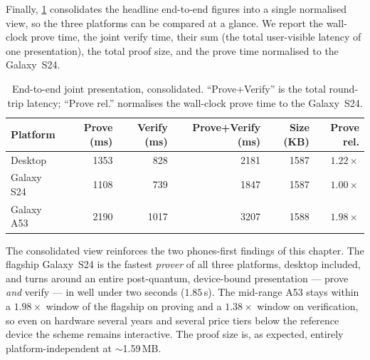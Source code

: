 \documentclass[binding=0.6cm,oneside,noexaminfo]{sapthesis}
\begin{document}
Finally, \cref{tab:res-crossplatform} consolidates the headline end-to-end
figures into a single normalised view, so the three platforms can be compared at a
glance. We report the wall-clock prove time, the joint verify time, their sum (the
total user-visible latency of one presentation), the total proof size, and the
prove time normalised to the Galaxy~S24.

\begin{table}[ht]
  \centering
  \caption{End-to-end joint presentation, consolidated. ``Prove+Verify'' is the
  total round-trip latency; ``Prove rel.'' normalises the wall-clock prove time to
  the Galaxy~S24.}
  \label{tab:res-crossplatform}
  \small
  \begin{tabular}{@{}lrrrrr@{}}
    \toprule
    \textbf{Platform} & \textbf{Prove (ms)} & \textbf{Verify (ms)} & \textbf{Prove+Verify (ms)} & \textbf{Size (KB)} & \textbf{Prove rel.} \\
    \midrule
    Desktop    & 1353 & 828  & 2181 & 1587 & $1.22\times$ \\
    Galaxy S24 & 1108 & 739  & 1847 & 1587 & $1.00\times$ \\
    Galaxy A53 & 2190 & 1017 & 3207 & 1588 & $1.98\times$ \\
    \bottomrule
  \end{tabular}
\end{table}

The consolidated view reinforces the two phones-first findings of this chapter.
The flagship Galaxy~S24 is the fastest \emph{prover} of all three platforms,
desktop included, and turns around an entire post-quantum, device-bound
presentation --- prove \emph{and} verify --- in well under two seconds
($1.85$\,s). The mid-range A53 stays within a $1.98\times$ window of the flagship
on proving and a $1.38\times$ window on verification, so even on hardware several
years and several price tiers below the reference device the scheme remains
interactive. The proof size is, as expected, entirely platform-independent at
$\sim$1.59\,MB.
\end{document}
